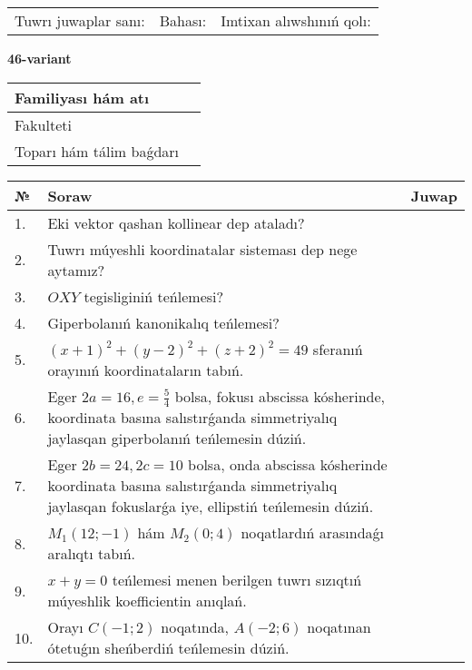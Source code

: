 \documentclass{article}
\begin{document}
\vspace{1cm}

\begin{tabular}{lll}
Tuwrı juwaplar sanı: \underline{\hspace{1.5cm}} & 
Bahası: \underline{\hspace{1.5cm}} & 
Imtixan alıwshınıń qolı: \underline{\hspace{2cm}} \\
\end{tabular}

\egroup

\newpage


\textbf{46-variant}\\

\bgroup
\def\arraystretch{1.6} %

\begin{tabular}{|m{5.7cm}|m{9.5cm}|}
\hline
Familiyası hám atı & \\
\hline
Fakulteti  & \\
\hline
Toparı hám tálim baǵdarı  & \\
\hline
\end{tabular}

\vspace{1cm}

\begin{tabular}{|m{0.7cm}|m{10cm}|m{4cm}|}
\hline
№ & Soraw & Juwap \\
\hline
1. & Eki vektor qashan kollinear dep ataladı? &  \\
\hline
2. & Tuwrı múyeshli koordinatalar sisteması dep nege aytamız? &  \\
\hline
3. & $OXY$ tegisliginiń teńlemesi? &  \\
\hline
4. & Giperbolanıń kanonikalıq teńlemesi? &  \\
\hline
5. & $(x+1)^{2}+(y-2) ^{2}+(z+2) ^{2}=49$ sferanıń orayınıń koordinataların tabıń. &  \\
\hline
6. & Eger $2a=16, e=\frac{5}{4}$ bolsa, fokusı abscissa kósherinde, koordinata basına salıstırǵanda simmetriyalıq jaylasqan giperbolanıń teńlemesin dúziń. &  \\
\hline
7. & Eger $2b=24, 2 c=10$ bolsa, onda abscissa kósherinde koordinata basına salıstırǵanda simmetriyalıq jaylasqan fokuslarǵa iye, ellipstiń teńlemesin dúziń. &  \\
\hline
8. & $M_{1} (12;-1)$ hám $M_{2} (0;4)$ noqatlardıń arasındaǵı aralıqtı tabıń. &  \\
\hline
9. & $x+y=0$ teńlemesi menen berilgen tuwrı sızıqtıń múyeshlik koefficientin anıqlań. &  \\
\hline
10. & Orayı $C (-1;2)$ noqatında, $A (-2;6 )$ noqatınan ótetuǵın sheńberdiń teńlemesin dúziń. &  \\
\hline
\end{tabular}
\end{document}
